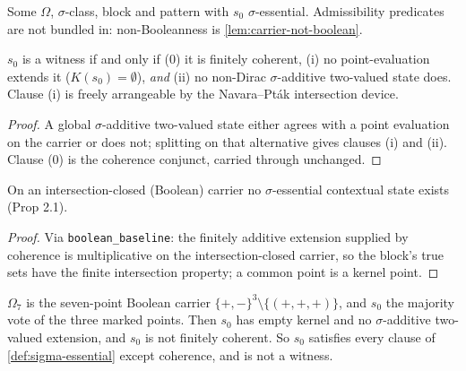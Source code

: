 \begin{definition}
\label{def:psi}
\leanok
{}
Some $\Omega$, $\sigma$-class, block and pattern with $s_0$ $\sigma$-essential.
Admissibility predicates are not bundled in: non-Booleanness is
\ref{lem:carrier-not-boolean}.
\end{definition}

\begin{theorem}
\label{thm:localization}
\leanok
{}
$s_0$ is a witness if and only if (0) it is finitely coherent, (i) no
point-evaluation extends it ($K(s_0) = \emptyset$), \emph{and} (ii) no
non-Dirac $\sigma$-additive two-valued state does. Clause (i) is freely
arrangeable by the Navara--Pt\'ak intersection device.
\end{theorem}

\begin{proof}
\leanok
A global $\sigma$-additive two-valued state either agrees with a point evaluation on the carrier or does not; splitting on that alternative gives clauses (i) and (ii). Clause (0) is the coherence conjunct, carried through unchanged.
\end{proof}

\begin{lemma}
\label{lem:boolean-no-witness}
\leanok
{}
On an intersection-closed (Boolean) carrier no $\sigma$-essential contextual
state exists (Prop 2.1).
\end{lemma}

\begin{proof}
\leanok
Via \texttt{boolean\_baseline}: the finitely additive extension supplied by
coherence is multiplicative on the intersection-closed carrier, so the block's
true sets have the finite intersection property; a common point is a kernel
point.
\end{proof}

\begin{theorem}
\label{thm:omega7}
\leanok
{}
$\Omega_7$ is the seven-point Boolean carrier $\{+,-\}^3 \setminus \{(+,+,+)\}$,
and $s_0$ the majority vote of the three marked points. Then $s_0$ has empty
kernel and no $\sigma$-additive two-valued extension, and $s_0$ is not finitely
coherent. So $s_0$ satisfies every clause of \ref{def:sigma-essential} except
coherence, and is not a witness.
\end{theorem}

